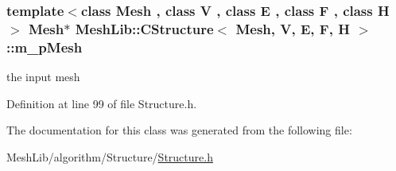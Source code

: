 \subsubsection[{\texorpdfstring{m\+\_\+p\+Mesh}{m_pMesh}}]{\setlength{\rightskip}{0pt plus 5cm}template$<$class Mesh , class V , class E , class F , class H $>$ Mesh$\ast$ {\bf Mesh\+Lib\+::\+C\+Structure}$<$ Mesh, V, E, F, H $>$\+::m\+\_\+p\+Mesh\hspace{0.3cm}{\ttfamily [protected]}}\hypertarget{class_mesh_lib_1_1_c_structure_a9241359e43cc23ef2a70c9ada3bc73a7}{}\label{class_mesh_lib_1_1_c_structure_a9241359e43cc23ef2a70c9ada3bc73a7}
the input mesh 

Definition at line 99 of file Structure.\+h.



The documentation for this class was generated from the following file\+:\begin{DoxyCompactItemize}
\item 
Mesh\+Lib/algorithm/\+Structure/\hyperlink{_structure_8h}{Structure.\+h}\end{DoxyCompactItemize}
